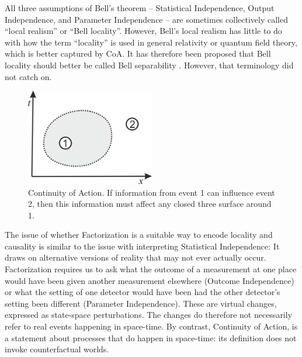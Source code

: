 \documentclass[12pt]{article}
\begin{document}
All three assumptions of Bell's theorem -- Statistical Independence, Output Independence, and Parameter Independence -- are sometimes collectively called ``local realism'' or ``Bell locality''. However, Bell's local realism has little to do with how the term ``locality'' is used in general relativity or quantum field theory, which is better captured by CoA.  It has therefore been proposed that Bell locality should better be called Bell separability \cite{Hall}. However, that terminology did not catch on. 



\begin{figure}[ht]
  \begin{center}
    \includegraphics[width=0.5\textwidth]{coa.png}
  \end{center}
  \caption{Continuity of Action. If information from event 1 can influence event 2, then this information must affect any closed three surface around 1. \label{fig2} }

\end{figure}



The issue of whether Factorization is a suitable way to encode locality and causality is similar to the issue with interpreting Statistical Independence: It draws on alternative versions of reality that may not ever actually occur. Factorization requires us to ask what the outcome of a measurement at one place would have been given another measurement elsewhere (Outcome Independence) or what the setting of one detector would have been had the other detector's setting been different (Parameter Independence). These are virtual changes, expressed as state-space perturbations. The changes do therefore not necessarily refer to real events happening in space-time. By contrast, Continuity of Action, is a statement about processes that do happen in space-time: its definition does not invoke counterfactual worlds. 
\end{document}
